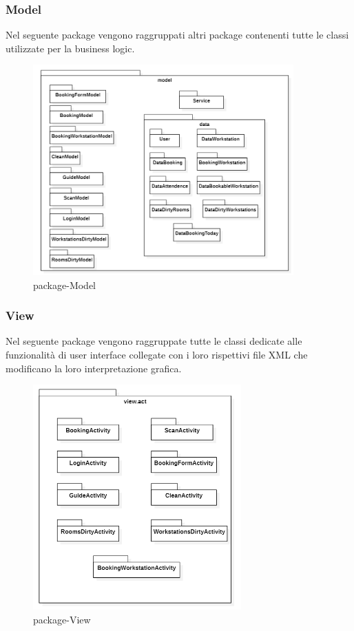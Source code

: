 \subsubsection{Model}
Nel seguente package vengono raggruppati altri package contenenti tutte le classi utilizzate per la business logic. 
\begin{figure}[H]
	\centering
	\includegraphics[width=10cm]{res/images/apputenti-packageModel.png}
	\caption{package-Model}
	\label{fig:package-Model}
\end{figure}


\subsubsection{View}
Nel seguente package vengono raggruppate tutte le classi dedicate alle funzionalità di user interface collegate con i loro rispettivi file XML che modificano la loro interpretazione grafica.
\begin{figure}[H]
	\centering
	\includegraphics[width=8cm]{res/images/apputenti-packageView.png}
	\caption{package-View}
	\label{fig:package-View}
\end{figure}

